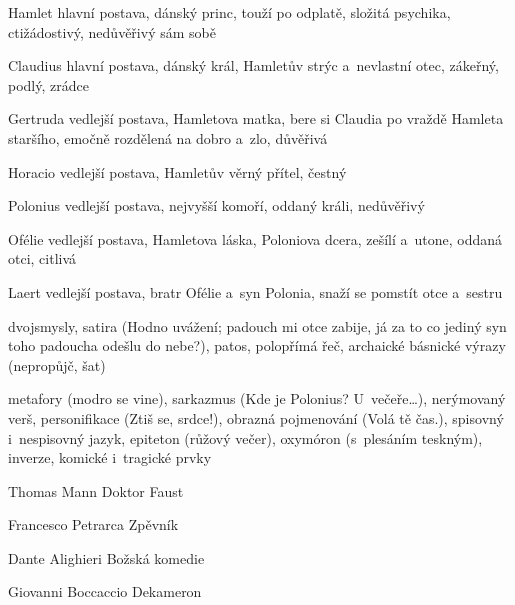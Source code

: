 {
\begin{compactdesc}
\item[Hamlet] hlavní postava, dánský princ, touží po odplatě, složitá psychika,
	ctižádostivý, nedůvěřivý sám sobě
\item[Claudius] hlavní postava, dánský král, Hamletův strýc a~nevlastní otec,
	zákeřný, podlý, zrádce
\item[Gertruda] vedlejší postava, Hamletova matka, bere si Claudia po vraždě
	Hamleta staršího, emočně rozdělená na dobro a~zlo, důvěřivá
\item[Horacio] vedlejší postava, Hamletův věrný přítel, čestný
\item[Polonius] vedlejší postava, nejvyšší komoří, oddaný králi, nedůvěřivý
\item[Ofélie] vedlejší postava, Hamletova láska, Poloniova dcera, zešílí
	a~utone, oddaná otci, citlivá
\item[Laert] vedlejší postava, bratr Ofélie a~syn Polonia, snaží se pomstít
	otce a~sestru
\end{compactdesc}

{dvojsmysly, satira (Hodno uvážení; padouch mi otce zabije, já za to co
jediný syn toho padoucha odešlu do nebe?), patos, polopřímá řeč, archaické 
básnické výrazy (nepropůjč, šat)}


\newpart

{metafory (modro se vine), sarkazmus (Kde je Polonius? U~večeře\dots), 
nerýmovaný verš, personifikace (Ztiš se, srdce!), obrazná pojmenování 
(Volá tě čas.), spisovný i~nespisovný jazyk, epiteton (růžový večer), 
oxymóron (s~plesáním teskným), inverze, komické i~tragické prvky}



\begin{compactdesc}
\item[Thomas Mann] Doktor Faust
\item[Francesco Petrarca] Zpěvník
\item[Dante Alighieri] Božská komedie
\item[Giovanni Boccaccio] Dekameron
\end{compactdesc}
}
